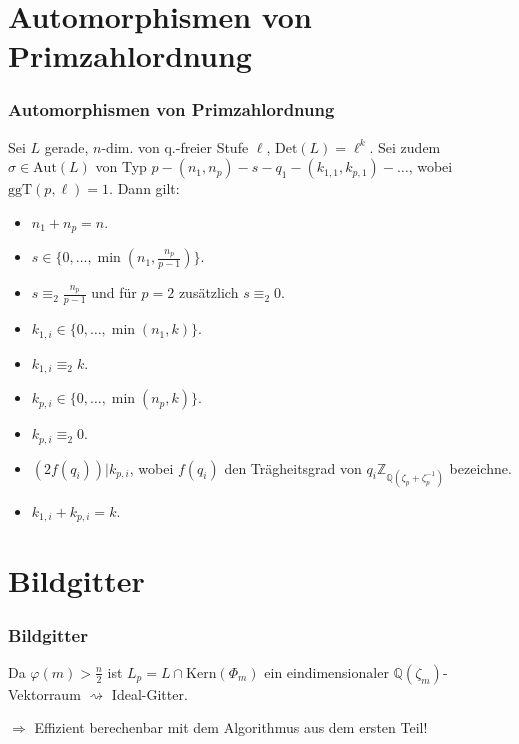 \documentclass{beamer}
\newcommand{\Z}{\mathbb{Z}}
\newcommand{\Q}{\mathbb{Q}}
\newcommand{\Det}{\text{Det}}
\newcommand{\Kern}{\text{Kern}}
\newcommand{\ggT}{\text{ggT}}
\newcommand{\Aut}{\text{Aut}}
\begin{document}
\section{Automorphismen von Primzahlordnung}
\frame{\tableofcontents[currentsection]}
\begin{frame}[plain]
	\frametitle{Automorphismen von Primzahlordnung}
	\begin{Satz}
		Sei $L$ gerade, $n$-dim. von q.-freier Stufe $\ell$, $\Det(L) = \ell^k$. Sei zudem $\sigma \in \Aut(L)$ von Typ $p - (n_1, n_p) - s - q_1 - (k_{1,1}, k_{p,1}) - \dots$, wobei $\ggT(p, \ell) = 1$. Dann gilt:
		\begin{itemize}
			\item $n_1 + n_p = n$.
			\item $s \in \lbrace 0, \dots, \min(n_1, \frac{n_p}{p-1}) \rbrace$.
			\item $s \equiv_2 \frac{n_p}{p-1}$ und für $p = 2$ zusätzlich $s \equiv_2 0$.
			\item $k_{1,i} \in \lbrace 0, \dots, \min(n_1, k) \rbrace$.
			\item $k_{1,i} \equiv_2 k$.
			\item $k_{p,i} \in \lbrace 0, \dots, \min(n_p, k) \rbrace$.
			\item $k_{p,i} \equiv_2 0$.
			\item $\left( 2f(q_i)\right) \vert k_{p,i}$, wobei $f(q_i)$ den Trägheitsgrad von $q_i \Z_{\Q(\zeta_p + \zeta_p^{-1})}$ bezeichne.
			\item $k_{1,i} + k_{p,i} = k$.
		\end{itemize}
	\end{Satz}
\end{frame}

\section{Bildgitter}
\frame{\tableofcontents[currentsection]}
\begin{frame}[plain]
	\frametitle{Bildgitter}
	Da $\varphi(m) > \frac{n}{2}$ ist $L_p = L \cap \Kern(\Phi_m)$ ein eindimensionaler $\Q(\zeta_m)$-Vektorraum $\rightsquigarrow$ Ideal-Gitter.\par
	\pause
	$\Rightarrow$ Effizient berechenbar mit dem Algorithmus aus dem ersten Teil!
\end{frame}
\end{document}
